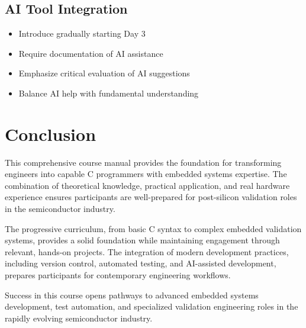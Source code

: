 \documentclass[11pt,a4paper]{article}
\begin{document}
\subsection{AI Tool Integration}
\begin{itemize}
    \item Introduce gradually starting Day 3
    \item Require documentation of AI assistance
    \item Emphasize critical evaluation of AI suggestions
    \item Balance AI help with fundamental understanding
\end{itemize}

\section{Conclusion}

This comprehensive course manual provides the foundation for transforming engineers into capable C programmers with embedded systems expertise. The combination of theoretical knowledge, practical application, and real hardware experience ensures participants are well-prepared for post-silicon validation roles in the semiconductor industry.

The progressive curriculum, from basic C syntax to complex embedded validation systems, provides a solid foundation while maintaining engagement through relevant, hands-on projects. The integration of modern development practices, including version control, automated testing, and AI-assisted development, prepares participants for contemporary engineering workflows.

Success in this course opens pathways to advanced embedded systems development, test automation, and specialized validation engineering roles in the rapidly evolving semiconductor industry.
\end{document}
